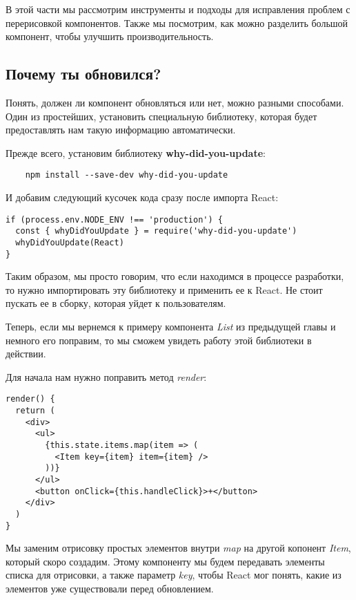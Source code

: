 В этой части мы рассмотрим инструменты и подходы для исправления проблем с перерисовкой компонентов. Также мы посмотрим, как можно разделить большой компонент, чтобы улучшить производительность.

\subsection{Почему ты обновился?}

Понять, должен ли компонент обновляться или нет, можно разными способами. Один из простейших, установить специальную библиотеку, которая будет предоставлять нам такую информацию автоматически.

Прежде всего, установим библиотеку \textbf{why-did-you-update}:

\begin{lstlisting}
	npm install --save-dev why-did-you-update
\end{lstlisting}

И добавим следующий кусочек кода сразу после импорта React:

\begin{lstlisting}
if (process.env.NODE_ENV !== 'production') {
  const { whyDidYouUpdate } = require('why-did-you-update')
  whyDidYouUpdate(React)
}
\end{lstlisting}

Таким образом, мы просто говорим, что если находимся в процессе разработки, то нужно импортировать эту библиотеку и применить ее к React. Не стоит пускать ее в сборку, которая уйдет к пользователям.

Теперь, если мы вернемся к примеру компонента \textit{List} из предыдущей главы и немного его поправим, то мы сможем увидеть работу этой библиотеки в действии.

Для начала нам нужно поправить метод \textit{render}:

\begin{lstlisting}
render() {
  return (
    <div>
      <ul>
        {this.state.items.map(item => (
          <Item key={item} item={item} />
        ))}
      </ul>
      <button onClick={this.handleClick}>+</button>
    </div>
  )
}
\end{lstlisting}

Мы заменим отрисовку простых элементов внутри \textit{map} на другой копонент \textit{Item}, который скоро создадим. Этому компоненту мы будем передавать элементы списка для отрисовки, а также параметр \textit{key}, чтобы React мог понять, какие из элементов уже существовали перед обновлением.


